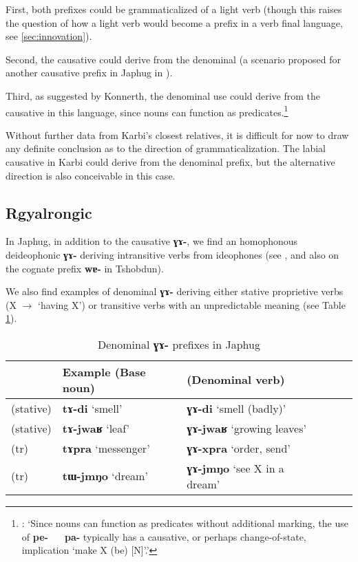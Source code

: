 \documentclass[oneside,a4paper,11pt]{article}
\newcommand{\ipa}[1]{\textbf{{\phon\mbox{#1}}}} %
\begin{document}
First, both prefixes could be grammaticalized of a light verb (though this raises the question of how a light verb would become a prefix in a verb final language, see \ref{sec:innovation}). 

Second, the causative could derive from the denominal (a scenario proposed for another causative prefix in Japhug in \citealt{jacques15causative}). 

Third, as suggested by Konnerth, the denominal use could derive from the causative in this language, since nouns can function as predicates.\footnote{\citet[205]{konnerth14karbi}: `Since nouns can function as predicates without additional marking, the use of \ipa{pe- ~ pa-} typically has a causative, or perhaps change-of-state, implication `make X (be) [N]'.'}

Without further data from Karbi's closest relatives, it is difficult for now to draw any definite conclusion as to the direction of grammaticalization. The labial causative in Karbi could derive from the denominal prefix, but the alternative direction is also conceivable in this case.

\subsection{Rgyalrongic} \label{sec:rgyalrong.denom}
In Japhug, in addition to the causative \ipa{ɣɤ-}, we find an homophonous deideophonic \ipa{ɣɤ-} deriving intransitive verbs from ideophones (see \citealt{japhug14ideophones}, and also \citealt{jackson14morpho} on the cognate prefix \ipa{wɐ-} in Tshobdun).

We also find examples of denominal \ipa{ɣɤ-} deriving either stative proprietive verbs (X $\rightarrow$ `having X') or transitive verbs with an unpredictable meaning (see Table \ref{tab:denominal.GA}).

\begin{table}[H]
\caption{Denominal \ipa{ɣɤ-} prefixes in Japhug} \label{tab:denominal.GA} \centering
\begin{tabular}{llllll}
\toprule
 & Example (Base noun) & (Denominal verb)\\
\midrule
(stative)& \ipa{tɤ-di} `smell' & \ipa{ɣɤ-di} `smell (badly)' \\
(stative) & \ipa{tɤ-jwaʁ} `leaf' & \ipa{ɣɤ-jwaʁ} `growing leaves' \\
\midrule
(tr) & \ipa{tɤpra} `messenger' & \ipa{ɣɤ-xpra} `order, send' \\
(tr) &\ipa{tɯ-jmŋo} `dream' & \ipa{ɣɤ-jmŋo} `see X in a dream' \\
\bottomrule
\end{tabular}
\end{table}
\end{document}

